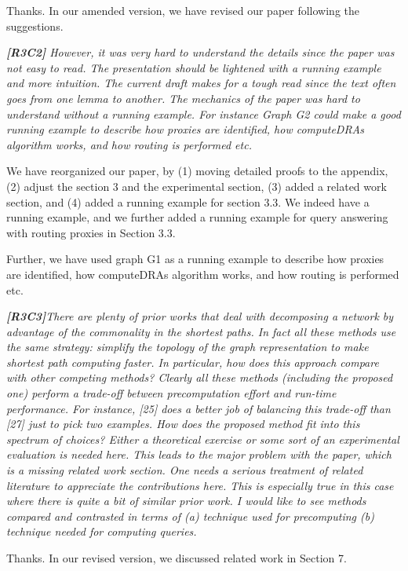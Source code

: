\documentclass[11pt]{letter}
\newcommand{\vs}{\vspace{1ex}}
\newcommand{\svs}{\vspace{0.36ex}}
\begin{document}
Thanks. In our amended version, we have revised our paper following the suggestions.



\vs
\noindent
{\em{\bf[R3C2]}  However, it was very hard to understand the details since the paper was not easy to read. The presentation should be lightened with a running example and more intuition.  The current draft makes for a tough read since the text often goes from one lemma to another. The mechanics of the paper was hard to understand without a running example.  For instance Graph G2 could make a good running example to describe how proxies are identified, how computeDRAs algorithm works, and how routing is performed etc.}
\svs

We have reorganized our paper, by (1) moving detailed proofs to the appendix, (2) adjust the section 3 and the experimental section, (3) added a related work section, and (4) added a running example for section 3.3. We indeed have a running example, and we further added a running example for query answering with routing proxies in Section 3.3.

Further, we have used graph G1 as a running example to describe how proxies are identified, how computeDRAs algorithm works, and how routing is performed etc.


\vs
\noindent
{\em{\bf[R3C3]}There are plenty of prior works that deal with decomposing a network by advantage of the commonality in the shortest paths. In fact all these methods use the same strategy: simplify the topology of the graph representation to make shortest path computing faster. In particular, how does this approach compare with other competing methods? Clearly all these methods (including the proposed one) perform a trade-off between precomputation effort and run-time performance. For instance, [25] does a better job of balancing this trade-off than [27] just to pick two examples. How does the proposed method fit into this spectrum of choices? Either a theoretical exercise or some sort of an experimental evaluation is needed here. This leads to the major problem with the paper, which is a missing related work section.  One needs a serious treatment of related literature to appreciate the contributions here. This is especially true in this case where there is quite a bit of similar prior work. I would like to see methods compared and contrasted in terms of (a) technique used for precomputing (b) technique needed for computing queries.}
\svs

Thanks. In our revised version, we discussed related work in Section 7.
\end{document}
